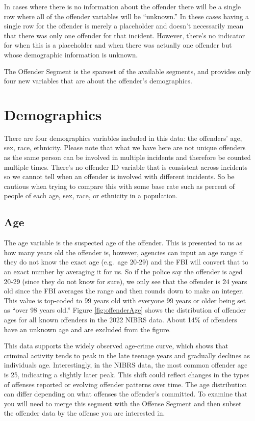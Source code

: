 \documentclass[
]{krantz}
\begin{document}
In cases where there is no information about the offender
there will be a single row where all of the offender
variables will be ``unknown.'' In these cases having a
single row for the offender is merely a placeholder and
doesn't necessarily mean that there was only one offender
for that incident. However, there's no indicator for when
this is a placeholder and when there was actually one
offender but whose demographic information is unknown.

The Offender Segment is the sparsest of the available
segments, and provides only four new variables that are
about the offender's demographics.

\section{Demographics}\label{demographics-1}

There are four demographics variables included in this data:
the offenders' age, sex, race, ethnicity. Please note that
what we have here are not unique offenders as the same
person can be involved in multiple incidents and therefore
be counted multiple times. There's no offender ID variable
that is consistent across incidents so we cannot tell when
an offender is involved with different incidents. So be
cautious when trying to compare this with some base rate
such as percent of people of each age, sex, race, or
ethnicity in a population.

\subsection{Age}\label{age-2}

The age variable is the suspected age of the offender. This
is presented to us as how many years old the offender is,
however, agencies can input an age range if they do not know
the exact age (e.g.~age 20-29) and the FBI will convert that
to an exact number by averaging it for us. So if the police
say the offender is aged 20-29 (since they do not know for
sure), we only see that the offender is 24 years old since
the FBI averages the range and then rounds down to make an
integer. This value is top-coded to 99 years old with
everyone 99 years or older being set as ``over 98 years
old.'' Figure \ref{fig:offenderAge} shows the distribution
of offender ages for all known offenders in the 2022 NIBRS
data. About 14\% of offenders have an unknown age and are
excluded from the figure.

This data supports the widely observed age-crime curve,
which shows that criminal activity tends to peak in the late
teenage years and gradually declines as individuals age.
Interestingly, in the NIBRS data, the most common offender
age is 25, indicating a slightly later peak. This shift
could reflect changes in the types of offenses reported or
evolving offender patterns over time. The age distribution
can differ depending on what offenses the offender's
committed. To examine that you will need to merge this
segment with the Offense Segment and then subset the
offender data by the offense you are interested in.
\end{document}
